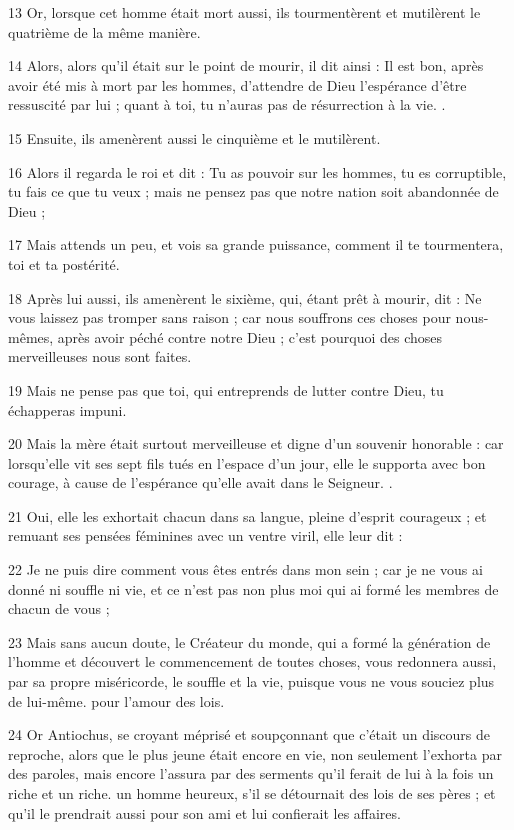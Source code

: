 \par 13 Or, lorsque cet homme était mort aussi, ils tourmentèrent et mutilèrent le quatrième de la même manière.
\par 14 Alors, alors qu'il était sur le point de mourir, il dit ainsi : Il est bon, après avoir été mis à mort par les hommes, d'attendre de Dieu l'espérance d'être ressuscité par lui ; quant à toi, tu n'auras pas de résurrection à la vie. .
\par 15 Ensuite, ils amenèrent aussi le cinquième et le mutilèrent.
\par 16 Alors il regarda le roi et dit : Tu as pouvoir sur les hommes, tu es corruptible, tu fais ce que tu veux ; mais ne pensez pas que notre nation soit abandonnée de Dieu ;
\par 17 Mais attends un peu, et vois sa grande puissance, comment il te tourmentera, toi et ta postérité.
\par 18 Après lui aussi, ils amenèrent le sixième, qui, étant prêt à mourir, dit : Ne vous laissez pas tromper sans raison ; car nous souffrons ces choses pour nous-mêmes, après avoir péché contre notre Dieu ; c'est pourquoi des choses merveilleuses nous sont faites.
\par 19 Mais ne pense pas que toi, qui entreprends de lutter contre Dieu, tu échapperas impuni.
\par 20 Mais la mère était surtout merveilleuse et digne d'un souvenir honorable : car lorsqu'elle vit ses sept fils tués en l'espace d'un jour, elle le supporta avec bon courage, à cause de l'espérance qu'elle avait dans le Seigneur. .
\par 21 Oui, elle les exhortait chacun dans sa langue, pleine d'esprit courageux ; et remuant ses pensées féminines avec un ventre viril, elle leur dit :
\par 22 Je ne puis dire comment vous êtes entrés dans mon sein ; car je ne vous ai donné ni souffle ni vie, et ce n'est pas non plus moi qui ai formé les membres de chacun de vous ;
\par 23 Mais sans aucun doute, le Créateur du monde, qui a formé la génération de l'homme et découvert le commencement de toutes choses, vous redonnera aussi, par sa propre miséricorde, le souffle et la vie, puisque vous ne vous souciez plus de lui-même. pour l'amour des lois.
\par 24 Or Antiochus, se croyant méprisé et soupçonnant que c'était un discours de reproche, alors que le plus jeune était encore en vie, non seulement l'exhorta par des paroles, mais encore l'assura par des serments qu'il ferait de lui à la fois un riche et un riche. un homme heureux, s'il se détournait des lois de ses pères ; et qu'il le prendrait aussi pour son ami et lui confierait les affaires.

